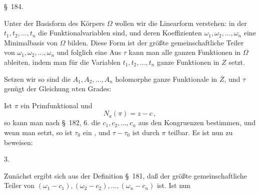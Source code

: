 \begin{center}
\S\ 184. 
\end{center}

Unter der Basisform des Körpers $\Omega$ wollen wir die Linearform
 verstehen:
in der $t_1, t_2, \ldots, t_n$ die Funktionalvariablen sind, und deren Koeffizienten
 $\omega_1, \omega_2, \ldots, \omega_n$ eine Minimalbasis von $\Omega$ bilden. Diese
Form ist der größte gemeinschaftliche Teiler von $\omega_1, \omega_2, \ldots, \omega_n$
und folglich eine  Aus $\tau$ kann man alle ganzen
Funktionen in $\Omega$ ableiten, indem man für die Variablen $t_1,
t_2, \ldots, t_n$ ganze Funktionen in $Z$ setzt.

Setzen wir
so sind die $A_1, A_2, \ldots, A_n$ holomorphe ganze Funktionale in
$\overline{Z}$, und $\tau$ genügt der Gleichung $n$ten Grades:

Ist $\pi$ ein Primfunktional und
\[
N_a(\pi) = z - c\,,
\]
so kann man nach \S\ 182, 6. die  $c_1, c_2, \ldots, c_n$ aus
den Kongruenzen
bestimmen, und wenn man
setzt, so ist $\tau_0$ ein , und $\tau - \tau_0$ ist
durch $\pi$ teilbar. Es ist nun zu beweisen:

3. 

Zunächst ergibt sich aus der Definition \S\ 181, daß
der größte gemeinschaftliche Teiler von $(\omega_1 - c_1), (\omega_2 - c_2), \ldots,
(\omega_n - c_n)$ ist. Ist nun
